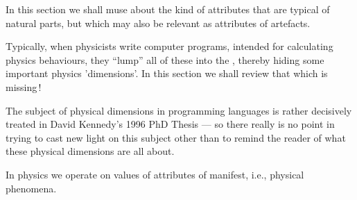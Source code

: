 \label{si}\label{si.1}\pos{\normalsize}{}

\begynd
\pind In this section we shall muse 
\begynd
\pind about the kind of attributes that
      are typical of natural parts,
\pind but which may also be relevant as attributes of artefacts.
\afslut

\pind Typically, when physicists write computer programs,
\begynd
\pind intended for calculating physics behaviours,
\pind they ``lump'' all of these into the  ,
\pind thereby hiding some important physics 'dimensions'.
\pind In this section we shall review that which is missing\,!
\afslut
\afslut

\pos{\psno}{\mnewfoil}
\begynd
\pind The subject of physical dimensions in programming languages \nyl
      is rather decisively treated in David Kennedy's 1996 PhD Thesis
      \cite{Kennedy96} ---
\pind so there really is no point in trying to cast new light on this subject
\pind other than to remind the reader of what these physical
      dimensions are all about.
\afslut

\label{si-1}

\begynd
\pind In physics we operate on \nyl values of attributes of manifest,
      i.e., physical phenomena. 
\afslut
{}

